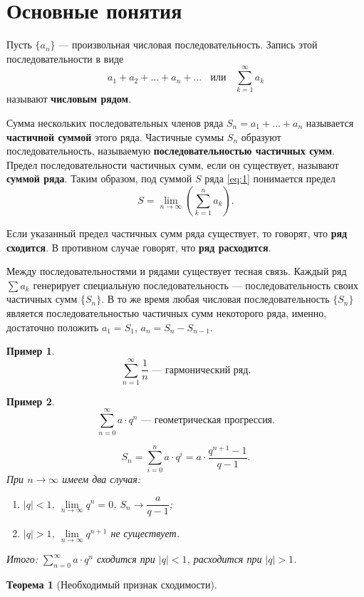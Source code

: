 \documentclass[12pt]{report}
\newtheorem{theorem}{Теорема}
\newtheorem{example}{Пример}
\newcommand\abs[1]{\left|#1\right|}
\begin{document}
\section{Основные понятия}
Пусть $\{a_n\}$ --- произвольная числовая последовательность. Запись этой последовательности в виде
\begin{equation} a_1 + a_2 + \ldots + a_n + \ldots~~~~\text{или}~~~~\sum_{k=1}^{\infty}a_k \end{equation} \label{eq:1}
называют \textbf{числовым рядом}.

Сумма нескольких последовательных членов ряда $S_n = a_1 + \ldots + a_n$ называется \textbf{частичной суммой} этого ряда. Частичные суммы $S_n$ образуют последовательность, называемую \textbf{последовательностью частичных сумм}. Предел последовательности частичных сумм, если он существует, называют \textbf{суммой ряда}. Таким образом, под суммой $S$ ряда \eqref{eq:1} понимается предел
\[ S = \lim_{n \to \infty} \left( \sum_{k=1}^{n} a_k \right).\]

Если указанный предел частичных сумм ряда существует, то говорят, что \textbf{ряд сходится}. В противном случае говорят, что \textbf{ряд расходится}.

Между последовательностями и рядами существует тесная связь. Каждый ряд $\sum a_k$ генерирует специальную последовательность --- последовательность своих частичных сумм $\{ S_n \}$. В то же время любая числовая последовательность $\{ S_n \}$ является последовательностью частичных сумм некоторого ряда, именно, достаточно положить $a_1 = S_1$, $a_n = S_n - S_{n-1}$.

\begin{example}
\[ \sum_{n = 1}^{\infty} \frac{1}{n} \text{ --- гармонический ряд.}\]
\end{example}

\begin{example}
\[ \sum_{n = 0}^{\infty} a \cdot q^n \text{ --- геометрическая прогрессия.} \]

\[S_n = \sum_{i=0}^{n} a \cdot q^i = a \cdot \frac{q^{n+1} - 1}{q - 1}.\]
При $n \to \infty$ имеем два случая:
\begin{enumerate}
\item $\abs{q} < 1$, $\lim\limits_{n \to \infty} q^n = 0$, $S_n \to \dfrac{a}{q - 1}$;
\item $\abs{q} > 1$, $\lim\limits_{n \to \infty} q^{n+1}$ не существует.
\end{enumerate}
Итого: $\sum\limits_{n = 0}^{\infty} a \cdot q ^n$ сходится при $\abs{q} < 1$, расходится при $\abs{q} > 1$.
\end{example}

\begin{theorem}[Необходимый признак сходимости]
\end{theorem}
\end{document}
